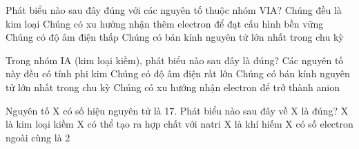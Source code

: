 \begin{ex}%
	Phát biểu nào sau đây đúng với các nguyên tố thuộc nhóm VIA?
	\choice
	{Chúng đều là kim loại}
	{\True Chúng có xu hướng nhận thêm electron để đạt cấu hình bền vững}
	{Chúng có độ âm điện thấp}
	{Chúng có bán kính nguyên tử lớn nhất trong chu kỳ}
\end{ex}
\begin{ex}%
	Trong nhóm IA (kim loại kiềm), phát biểu nào sau đây là đúng?
	\choice
	{Các nguyên tố này đều có tính phi kim}
	{Chúng có độ âm điện rất lớn}
	{\True Chúng có bán kính nguyên tử lớn nhất trong chu kỳ}
	{Chúng có xu hướng nhận electron để trở thành anion}
\end{ex}
\begin{ex}%
	Nguyên tố X có số hiệu nguyên tử là 17. Phát biểu nào sau đây về X là đúng?
	\choice
	{X là kim loại kiềm}
	{\True X có thể tạo ra hợp chất với natri}
	{X là khí hiếm}
	{X có số electron ngoài cùng là 2}
\end{ex}

